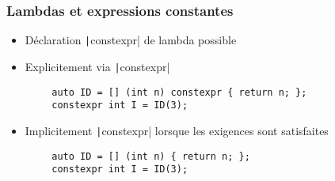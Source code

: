 \documentclass[C++.tex]{subfiles}
\begin{document}
\begin{frame}[fragile]
	\frametitle{Lambdas et expressions constantes}
	\begin{itemize}
		\item Déclaration \texttt|constexpr| de lambda possible
		\item Explicitement via \texttt|constexpr|
	\end{itemize}

	\begin{verbatim}
		auto ID = [] (int n) constexpr { return n; };
		constexpr int I = ID(3);
	\end{verbatim}

	\begin{itemize}
		\item Implicitement \texttt|constexpr| lorsque les exigences sont satisfaites
	\end{itemize}

	\begin{verbatim}
		auto ID = [] (int n) { return n; };
		constexpr int I = ID(3);
	\end{verbatim}



\end{frame}
\end{document}

